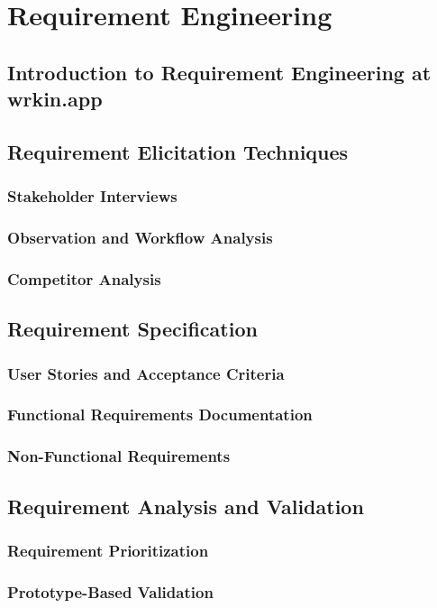 \documentclass[a4paper, 11pt, oneside]{report}
\begin{document}
\chapter{Requirement Engineering}
\section{Introduction to Requirement Engineering at wrkin.app}
\section{Requirement Elicitation Techniques}
\subsection{Stakeholder Interviews}
\subsection{Observation and Workflow Analysis}
\subsection{Competitor Analysis}
\section{Requirement Specification}
\subsection{User Stories and Acceptance Criteria}
\subsection{Functional Requirements Documentation}
\subsection{Non-Functional Requirements}
\section{Requirement Analysis and Validation}
\subsection{Requirement Prioritization}
\subsection{Prototype-Based Validation}
\end{document}
